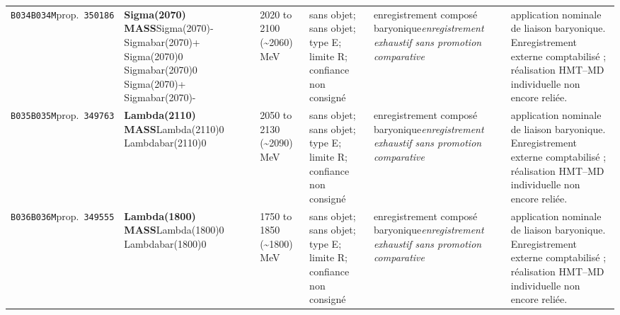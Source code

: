\begin{landscape}
\begin{longtable}{L{1.85cm}L{4.45cm}L{2.35cm}L{4.05cm}L{3.35cm}L{7.15cm}}
\texttt{B034}\newline \texttt{B034M}\newline prop.\ \texttt{350186} & \textbf{Sigma(2070) MASS}\newline Sigma(2070)- \textbar{}\allowbreak{} Sigmabar(2070)+ \textbar{}\allowbreak{} Sigma(2070)0 \textbar{}\allowbreak{} Sigmabar(2070)0 \textbar{}\allowbreak{} Sigma(2070)+ \textbar{}\allowbreak{} Sigmabar(2070)- & 2020 to 2100 (\textasciitilde{}2060)\,MeV & sans objet; sans objet; type E; limite R; confiance non consigné & enregistrement composé baryonique\newline \emph{enregistrement exhaustif sans promotion comparative} & application nominale de liaison baryonique. Enregistrement externe comptabilisé ; réalisation HMT--MD individuelle non encore reliée. \\
\texttt{B035}\newline \texttt{B035M}\newline prop.\ \texttt{349763} & \textbf{Lambda(2110) MASS}\newline Lambda(2110)0 \textbar{}\allowbreak{} Lambdabar(2110)0 & 2050 to 2130 (\textasciitilde{}2090)\,MeV & sans objet; sans objet; type E; limite R; confiance non consigné & enregistrement composé baryonique\newline \emph{enregistrement exhaustif sans promotion comparative} & application nominale de liaison baryonique. Enregistrement externe comptabilisé ; réalisation HMT--MD individuelle non encore reliée. \\
\texttt{B036}\newline \texttt{B036M}\newline prop.\ \texttt{349555} & \textbf{Lambda(1800) MASS}\newline Lambda(1800)0 \textbar{}\allowbreak{} Lambdabar(1800)0 & 1750 to 1850 (\textasciitilde{}1800)\,MeV & sans objet; sans objet; type E; limite R; confiance non consigné & enregistrement composé baryonique\newline \emph{enregistrement exhaustif sans promotion comparative} & application nominale de liaison baryonique. Enregistrement externe comptabilisé ; réalisation HMT--MD individuelle non encore reliée. \\

\end{longtable}
\end{landscape}
